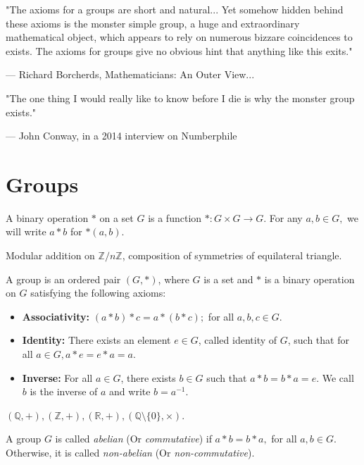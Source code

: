 \epigraph{"The axioms for a groups are short and natural... Yet somehow hidden behind these axioms is the monster simple group, a huge and extraordinary mathematical object, which appears to rely on numerous bizzare coincidences to exists. The axioms for groups give no obvious hint that anything like this exits."}{--- \textup{Richard Borcherds}, Mathematicians: An Outer View...}
\vspace{-20pt}
\epigraph{"The one thing I would really like to know before I die is why the monster group exists."}{--- \textup{John Conway}, in a 2014 interview on Numberphile}
\section{Groups}
\begin{definition}
    A binary operation $*$ on a set $G$ is a function $*:G \times G \longrightarrow G$. For any $a, b \in G,$ we will write $a * b$ for $*(a, b)$.
\end{definition}
\begin{eg}
    Modular addition on $\mathbb{Z}/n\mathbb{Z}$, composition of symmetries of equilateral triangle.
\end{eg}
\begin{definition}[Group]
    A group is an ordered pair $(G,*)$, where $G$ is a set and $*$ is a binary operation on $G$ satisfying the following axioms:
    \begin{itemize}
        \item \textbf{Associativity:} $(a * b) * c = a * (b * c);$ for all $a, b, c \in G.$
        \item \textbf{Identity:} There exists an element $e \in G$, called identity of $G$, such that for all $a \in G, a * e = e * a = a.$
        \item \textbf{Inverse:} For all $a \in G$, there exists $b\in G$ such that $a * b = b * a = e.$ We call $b$ is the inverse of $a$ and write $b = a^{-1}.$ 
    \end{itemize}
\end{definition}
\begin{eg}
    $(\mathbb{Q}, +), (\mathbb{Z}, +), (\mathbb{R}, +), (\mathbb{Q}\setminus\{0\}, \times)$.
\end{eg}
\begin{definition}
A group $G$ is called \textit{abelian} (Or \textit{commutative}) if $a * b = b * a,$ for all $a, b \in G$. Otherwise, it is called \textit{non-abelian} (Or \textit{non-commutative}).
\end{definition}
